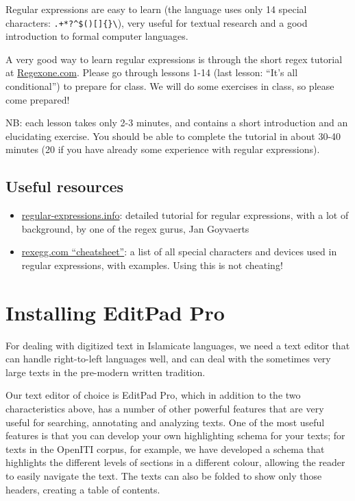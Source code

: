 \documentclass[
]{book}
\providecommand{\tightlist}{%
  \setlength{\itemsep}{0pt}\setlength{\parskip}{0pt}}
\begin{document}
Regular expressions are easy to learn (the language uses only 14 special characters: \texttt{.+*?\^{}\$(){[}{]}\{\}\textbar{}\textbackslash{}}), very useful for textual research and a good introduction to formal computer languages.

A very good way to learn regular expressions is through the short regex tutorial at \href{https://Regexone.com}{Regexone.com}.
Please go through lessons 1-14 (last lesson: ``It's all conditional'') to prepare for class. We will do some exercises in class, so please come prepared!

NB: each lesson takes only 2-3 minutes, and contains a short introduction and an elucidating exercise. You should be able to complete the tutorial in about 30-40 minutes (20 if you have already some experience with regular expressions).

\hypertarget{useful-resources}{%
\subsection{Useful resources}\label{useful-resources}}

\begin{itemize}
\tightlist
\item
  \href{https://www.regular-expressions.info/tutorial.html}{regular-expressions.info}: detailed tutorial for regular expressions, with a lot of background, by one of the regex gurus, Jan Goyvaerts
\item
  \href{https://www.rexegg.com/regex-quickstart.html\#chars}{rexegg.com ``cheatsheet''}: a list of all special characters and devices used in regular expressions, with examples. Using this is not cheating!
\end{itemize}

\hypertarget{installing-editpad-pro}{%
\section{Installing EditPad Pro}\label{installing-editpad-pro}}

For dealing with digitized text in Islamicate languages, we need a text editor that can handle right-to-left languages well, and can deal with the sometimes very large texts in the pre-modern written tradition.

Our text editor of choice is EditPad Pro, which in addition to the two characteristics above, has a number of other powerful features that are very useful for searching, annotating and analyzing texts. One of the most useful features is that you can develop your own highlighting schema for your texts; for texts in the OpenITI corpus, for example, we have developed a schema that highlights the different levels of sections in a different colour, allowing the reader to easily navigate the text. The texts can also be folded to show only those headers, creating a table of contents.
\end{document}
